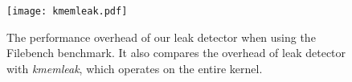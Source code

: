 \begin{figure}[t]
\begin{center}
\texttt{[image: kmemleak.pdf]}
\end{center}
\caption[Performance impact of leak detector on Filebench server benchmarks.]{\label{fig:leak_detector-kmemleak}The performance overhead of our leak detector when using the Filebench benchmark. It also compares the overhead of leak detector with \emph{kmemleak}, which operates on the entire kernel.}
\end{figure}
